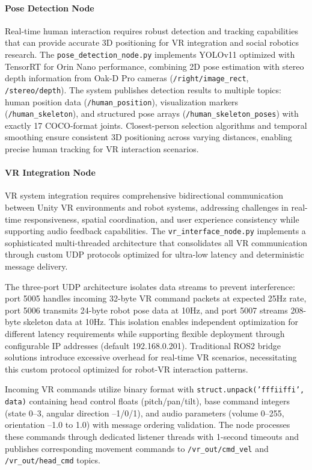 \paragraph{Pose Detection Node}

Real-time human interaction requires robust detection and tracking capabilities that can provide accurate 3D positioning for VR integration and social robotics research. The \texttt{pose\_detection\_node.py} implements YOLOv11 optimized with TensorRT for Orin Nano performance, combining 2D pose estimation with stereo depth information from Oak-D Pro cameras (\texttt{/right/image\_rect}, \texttt{/stereo/depth}). The system publishes detection results to multiple topics: human position data (\texttt{/human\_position}), visualization markers (\texttt{/human\_skeleton}), and structured pose arrays (\texttt{/human\_skeleton\_poses}) with exactly 17 COCO-format joints. Closest-person selection algorithms and temporal smoothing ensure consistent 3D positioning across varying distances, enabling precise human tracking for VR interaction scenarios.

\paragraph{VR Integration Node}

VR system integration requires comprehensive bidirectional communication between Unity VR environments and robot systems, addressing challenges in real-time responsiveness, spatial coordination, and user experience consistency while supporting audio feedback capabilities. The \texttt{vr\_interface\_node.py} implements a sophisticated multi-threaded architecture that consolidates all VR communication through custom UDP protocols optimized for ultra-low latency and deterministic message delivery.

The three-port UDP architecture isolates data streams to prevent interference: port 5005 handles incoming 32-byte VR command packets at expected 25Hz rate, port 5006 transmits 24-byte robot pose data at 10Hz, and port 5007 streams 208-byte skeleton data at 10Hz. This isolation enables independent optimization for different latency requirements while supporting flexible deployment through configurable IP addresses (default 192.168.0.201). Traditional ROS2 bridge solutions introduce excessive overhead for real-time VR scenarios, necessitating this custom protocol optimized for robot-VR interaction patterns.

Incoming VR commands utilize binary format with \texttt{struct.unpack('fffiiffi', data)} containing head control floats (pitch/pan/tilt), base command integers (state 0--3, angular direction --1/0/1), and audio parameters (volume 0--255, orientation --1.0 to 1.0) with message ordering validation. The node processes these commands through dedicated listener threads with 1-second timeouts and publishes corresponding movement commands to \texttt{/vr\_out/cmd\_vel} and \texttt{/vr\_out/head\_cmd} topics.

